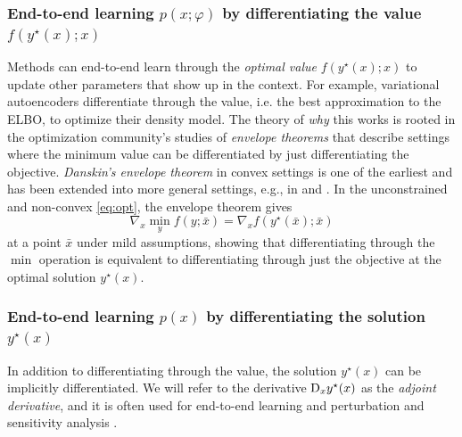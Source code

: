 \documentclass[twoside,11pt]{article}
\newcommand{\eg}{e.g.\xspace}
\newcommand{\ie}{i.e.\xspace}
\begin{document}
\subsubsection{End-to-end learning $p(x; \varphi)$ by differentiating
  the value $f(y^\star(x); x)$}
Methods can end-to-end learn through the \emph{optimal value}
$f(y^\star(x); x)$ to update other parameters that show up
in the context.
For example, variational autoencoders differentiate through
the value, \ie the best approximation to the ELBO,
to optimize their density model.
The theory of \emph{why} this works is rooted in the
optimization community's studies of
\emph{envelope theorems}
that describe settings where the minimum value
can be differentiated by just differentiating
the objective.
\emph{Danskin's envelope theorem} \citep{danskin1966theory}
in convex settings is one of the earliest and has been
extended into more general settings, \eg, in
\citep[Prop. A.22]{bertsekas1971control}
and \cite{carter2001foundations,milgrom2002envelope,bonnans2013perturbation}.
In the unconstrained and non-convex \cref{eq:opt},
the envelope theorem gives
\begin{equation}
  \nabla_x \min_y f(y; \bar x) = \nabla_x f(y^\star(\bar x); \bar x)
  \label{eq:envelope}
\end{equation}
at a point $\bar x$ under mild assumptions, showing
that differentiating through the $\min$ operation is equivalent to differentiating
through just the objective at the optimal solution $y^\star(x)$.

\subsubsection{End-to-end learning $p(x)$ by differentiating the solution $y^\star(x)$}
In addition to differentiating through the value, the solution
$y^\star(x)$ can be implicitly differentiated.
We will refer to the derivative $\mathrm{D}_x y^\star(x)$
as the \emph{adjoint derivative}, and it is often used for
end-to-end learning
\citep{domke2012generic,gould2016differentiating,amos2017optnet,barratt2018differentiability,amos2019differentiable,agrawal2019differentiable,bai2019deep,bai2020multiscale}
and perturbation and sensitivity analysis
\citep{bank1982non,fiacco1990sensitivity,shapiro2003sensitivity,klatte2006nonsmooth,bonnans2013perturbation,still2018lectures,fiacco2020mathematical}.
\end{document}
